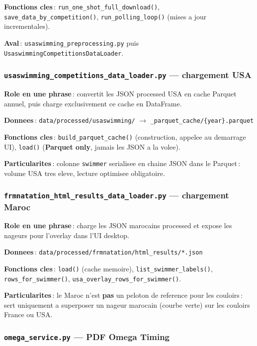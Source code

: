 \documentclass[11pt,a4paper]{article}
\begin{document}
\textbf{Fonctions cles}\,: \texttt{run\_one\_shot\_full\_download()}, \texttt{save\_data\_by\_competition()}, \texttt{run\_polling\_loop()} (mises a jour incrementales).

\textbf{Aval}\,: \texttt{usaswimming\_preprocessing.py} puis \texttt{UsaswimmingCompetitionsDataLoader}.

\subsubsection{\texttt{usaswimming\_competitions\_data\_loader.py} --- chargement USA}

\textbf{Role en une phrase}\,: convertit les JSON processed USA en cache Parquet annuel, puis charge exclusivement ce cache en DataFrame.

\textbf{Donnees}\,: \texttt{data/processed/usaswimming/} $\rightarrow$ \texttt{\_parquet\_cache/\{year\}.parquet}

\textbf{Fonctions cles}\,: \texttt{build\_parquet\_cache()} (construction, appelee au demarrage UI), \texttt{load()} (\textbf{Parquet only}, jamais les JSON a la volee).

\textbf{Particularites}\,: colonne \texttt{swimmer} serialisee en chaine JSON dans le Parquet\,: volume USA tres eleve, lecture optimisee obligatoire.

\subsubsection{\texttt{frmnatation\_html\_results\_data\_loader.py} --- chargement Maroc}

\textbf{Role en une phrase}\,: charge les JSON marocains processed et expose les nageurs pour l'overlay dans l'UI desktop.

\textbf{Donnees}\,: \texttt{data/processed/frmnatation/html\_results/*.json}

\textbf{Fonctions cles}\,: \texttt{load()} (cache memoire), \texttt{list\_swimmer\_labels()}, \texttt{rows\_for\_swimmer()}, \texttt{usa\_overlay\_rows\_for\_swimmer()}.

\textbf{Particularites}\,: le Maroc n'est \textbf{pas} un peloton de reference pour les couloirs\,: sert uniquement a superposer un nageur marocain (courbe verte) sur les couloirs France ou USA.

\subsubsection{\texttt{omega\_service.py} --- PDF Omega Timing}
\end{document}
